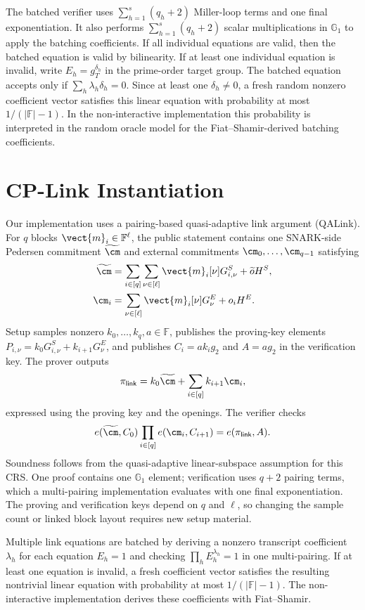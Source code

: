 The batched verifier uses \(\sum_{h=1}^{s}(q_h+2)\) Miller-loop terms and one
final exponentiation.  It also performs \(\sum_{h=1}^{s}(q_h+2)\) scalar
multiplications in \(\mathbb{G}_1\) to apply the batching coefficients.  If all
individual equations are valid, then the batched equation is valid by
bilinearity.  If at least one individual equation is invalid, write
\(E_h=g_T^{\delta_h}\) in the prime-order target group.  The batched equation
accepts only if \(\sum_h \lambda_h\delta_h=0\).  Since at least one
\(\delta_h\neq 0\), a fresh random nonzero coefficient vector satisfies this
linear equation with probability at most \(1/(|\mathbb{F}|-1)\).  In the
non-interactive implementation this probability is interpreted in the random
oracle model for the Fiat--Shamir-derived batching coefficients.
\fi

\section{CP-Link Instantiation}
\label{app:cplink-instant}

Our implementation uses a pairing-based quasi-adaptive link argument
(QALink).  For \(q\) blocks \(\vect{m}_i\in\mathbb{F}^{\ell}\), the public
statement contains one SNARK-side Pedersen commitment \(\widetilde{\cm}\) and
external commitments \(\cm_0,\ldots,\cm_{q-1}\) satisfying
\[
\begin{aligned}
\widetilde{\cm}
 &=\sum_{i\in[q]}\sum_{\nu\in[\ell]}
   \vect{m}_i[\nu]G^S_{i,\nu}+\widetilde{o}H^S,\\
\cm_i
 &=\sum_{\nu\in[\ell]}\vect{m}_i[\nu]G^E_\nu+o_iH^E.
\end{aligned}
\]
Setup samples nonzero \(k_0,\ldots,k_q,a\in\mathbb{F}\), publishes the
proving-key elements
\(P_{i,\nu}=k_0G^S_{i,\nu}+k_{i+1}G^E_\nu\), and publishes
\(C_i=ak_ig_2\) and \(A=ag_2\) in the verification key.  The prover outputs
\[
 \pi_{\mathsf{link}}
 =k_0\widetilde{\cm}+\sum_{i\in[q]}k_{i+1}\cm_i,
\]
expressed using the proving key and the openings.  The verifier checks
\[
 e(\widetilde{\cm},C_0)
 \prod_{i\in[q]}e(\cm_i,C_{i+1})
 =e(\pi_{\mathsf{link}},A).
\]
Soundness follows from the quasi-adaptive linear-subspace assumption for this
CRS.  One proof contains one \(\mathbb{G}_1\) element; verification uses
\(q+2\) pairing terms, which a multi-pairing implementation evaluates with one
final exponentiation.  The proving and verification keys depend on \(q\) and
\(\ell\), so changing the sample count or linked block layout requires new
setup material.

Multiple link equations are batched by deriving a nonzero transcript
coefficient \(\lambda_h\) for each equation \(E_h=1\) and checking
\(\prod_h E_h^{\lambda_h}=1\) in one multi-pairing.  If at least one equation
is invalid, a fresh coefficient vector satisfies the resulting nontrivial
linear equation with probability at most \(1/(|\mathbb{F}|-1)\).  The
non-interactive implementation derives these coefficients with Fiat--Shamir.
